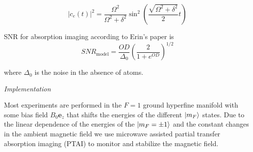\documentclass[
superscriptaddress,
amsmath,
amssymb,
aps,
prl,
twocolumn,
floatfix
]{revtex4-1}
\def\ez{\mathbf{e}_z}
\def\ket#1{\mathinner{|{#1}\rangle}}
\begin{document}
\begin{equation}
	\vert c_e(t)\vert^2=\frac{\Omega^2}{\Omega^2+\delta^2}\sin^2\left(\frac{\sqrt{\Omega^2+\delta^2}}{2}t\right)
	\label{eq:Rabi_oscillations}	
\end{equation}

SNR for absorption imaging according to Erin's paper is 
\begin{equation}
	SNR_{\mathrm{model}}=\frac{OD}{\Delta_0}\left(\frac{2}{1+e^{OD}}\right)^{1/2}
\end{equation}

where $\Delta_0$ is the noise in the absence of atoms.

%
%

{\it Implementation} 

Most experiments are performed in the $F=1$ ground hyperfine manifold with some bias field $B_0\ez$ that shifts the energies of the different $\ket{m_F}$ states. Due to the linear dependence of the energies of the $\ket{m_F=\pm1}$ and the constant changes in the ambient magnetic field we use microwave assisted partial transfer absorption imaging (PTAI) to monitor and stabilize the magnetic field. 
\end{document}
